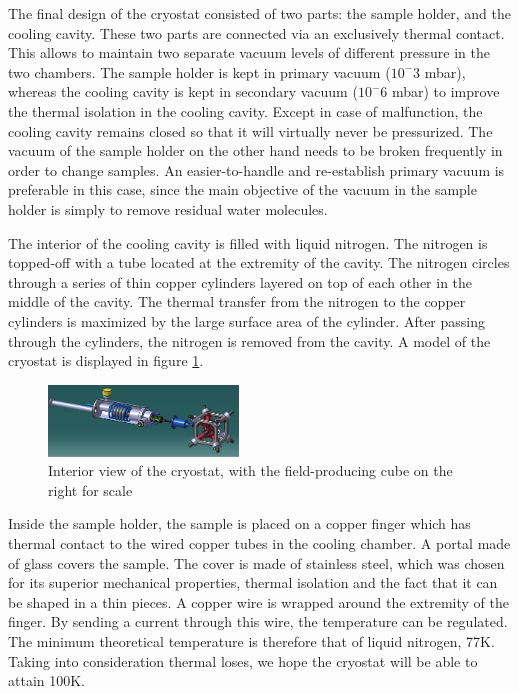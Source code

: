 \documentclass[journal,a4paper]{IEEEtran}
\begin{document}
The final design of the cryostat consisted of two parts: the sample holder, and the cooling cavity. These two parts are connected via an exclusively thermal contact. This allows to maintain two separate vacuum levels of different pressure in the two chambers. The sample holder is kept in primary vacuum ($10^-3$ mbar), whereas the cooling cavity is kept in secondary vacuum ($10^-6$ mbar) to improve the thermal isolation in the cooling cavity. Except in case of malfunction, the cooling cavity remains closed so that it will virtually never be pressurized. The vacuum of the sample holder on the other hand needs to be broken frequently in order to change samples. An easier-to-handle and re-establish primary vacuum is preferable in this case, since the main objective of the vacuum in the sample holder is simply to remove residual water molecules.

The interior of the cooling cavity is filled with liquid nitrogen. The nitrogen is topped-off with a tube located at the extremity of the cavity. The nitrogen circles through a series of thin copper cylinders layered on top of each other in the middle of the cavity.  The thermal transfer from the nitrogen to the copper cylinders is maximized by the large surface area of the cylinder. After passing through the cylinders, the nitrogen is removed from the cavity. A model of the cryostat is displayed in figure \ref{f cryostat}.

\begin{figure}[h]
\includegraphics[width=0.45\textwidth]{Cryo_1.jpg}
\caption{Interior view of the cryostat, with the field-producing cube on the right for scale}
\label{f cryostat}
\end{figure}

Inside the sample holder, the sample is placed on a copper finger which has thermal contact to the wired copper tubes in the cooling chamber. A portal made of glass covers the sample. The cover is made of stainless steel, which was chosen for its superior mechanical properties, thermal isolation and the fact that it can be shaped in a thin pieces. A copper wire is wrapped around the extremity of the finger. By sending a current through this wire, the temperature can be regulated. The minimum theoretical temperature is therefore that of liquid nitrogen, 77K. Taking into consideration thermal loses, we hope the cryostat will be able to attain 100K.
\end{document}

